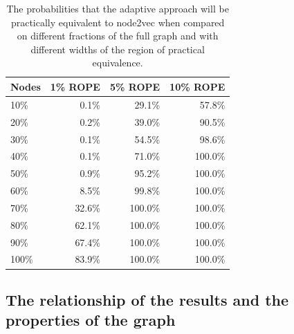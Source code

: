 \begin{table}
  \begin{center}
    \begin{minipage}{210pt} %
      \caption{The probabilities that the adaptive approach will be practically equivalent to node2vec when compared on different fractions of the full graph and with different widths of the region of practical equivalence.}
      \label{tab:bayesian-adaptive}
      \begin{tabular}{lrrr}
        \toprule
        \textbf{Nodes} & \textbf{1\% ROPE} & \textbf{5\% ROPE} & \textbf{10\% ROPE} \\
        \midrule
        10\%                & 0.1\%             & 29.1\%            & 57.8\%             \\
        20\%                & 0.2\%             & 39.0\%            & 90.5\%             \\
        30\%                & 0.1\%             & 54.5\%            & 98.6\%             \\
        40\%                & 0.1\%             & 71.0\%            & 100.0\%            \\
        50\%                & 0.9\%             & 95.2\%            & 100.0\%            \\
        60\%                & 8.5\%             & 99.8\%            & 100.0\%            \\
        70\%                & 32.6\%            & 100.0\%           & 100.0\%            \\
        80\%                & 62.1\%            & 100.0\%           & 100.0\%            \\
        90\%                & 67.4\%            & 100.0\%           & 100.0\%            \\
        100\%               & 83.9\%            & 100.0\%           & 100.0\%            \\
        \bottomrule
      \end{tabular}
    \end{minipage}
  \end{center}
\end{table}

\subsection{The relationship of the results and the properties of the graph}


